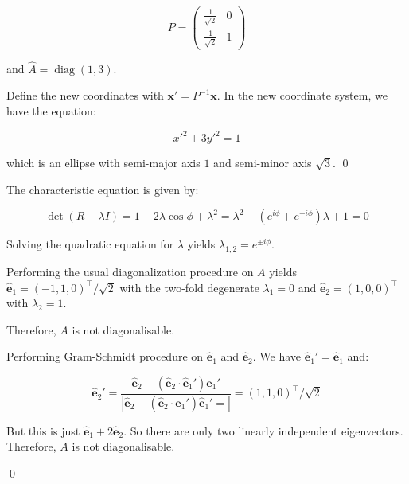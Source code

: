 \documentclass[12pt]{article}
\begin{document}
\begin{equation}
    P =
    \begin{pmatrix}
        \frac{1}{\sqrt{2}} & 0 \\
        \frac{1}{\sqrt{2}} & 1
    \end{pmatrix}
\end{equation}

and $\hat{A} = \operatorname{diag}(1, 3)$.

Define the new coordinates with $\mathbf{x}' = P^{-1} \mathbf{x}$. In the new coordinate system, we have the equation:

\begin{equation}
    x'^{2} + 3y'^{2} = 1
\end{equation}

which is an ellipse with semi-major axis $1$ and semi-minor axis $\sqrt{3}$.
\qed



The characteristic equation is given by:

\begin{equation}
    \det(R - \lambda I) = 1 - 2 \lambda \cos{\phi} + \lambda^{2} = \lambda^{2} - (e^{i\phi} + e^{-i\phi})\lambda + 1 = 0
\end{equation}

Solving the quadratic equation for $\lambda$ yields $\lambda_{1, 2} = e^{\pm i\phi}$.

Performing the usual diagonalization procedure on $A$ yields $\hat{\mathbf{e}}_{1} = (-1, 1, 0)^{\intercal}/\sqrt{2}$ with the two-fold degenerate $\lambda_{1} = 0$ and $\hat{\mathbf{e}}_{2} = (1, 0, 0)^{\intercal}$ with $\lambda_{2} = 1$.

 Therefore, $A$ is not diagonalisable.

\begin{correction}
    Performing Gram-Schmidt procedure on $\hat{\mathbf{e}}_{1}$ and $\hat{\mathbf{e}}_{2}$. We have $\hat{\mathbf{e}}_{1}' = \hat{\mathbf{e}}_{1}$ and:

    \begin{equation}
        \hat{\mathbf{e}}_{2}' = \frac{\hat{\mathbf{e}}_{2} - (\hat{\mathbf{e}}_{2} \cdot \hat{\mathbf{e}}_{1}') \hat{\mathbf{e}}_{1}'}{\left\lvert \hat{\mathbf{e}}_{2} - (\hat{\mathbf{e}}_{2} \cdot \hat{\mathbf{e}}_{1}') \hat{\mathbf{e}}_{1}' =  \right\rvert} = (1, 1, 0)^{\intercal}/\sqrt{2}
    \end{equation}

    But this is just $\hat{\mathbf{e}}_{1} + 2\hat{\mathbf{e}}_{2}$. So there are only two linearly independent eigenvectors. Therefore, $A$ is not diagonalisable.
\end{correction}
\qed
\end{document}
